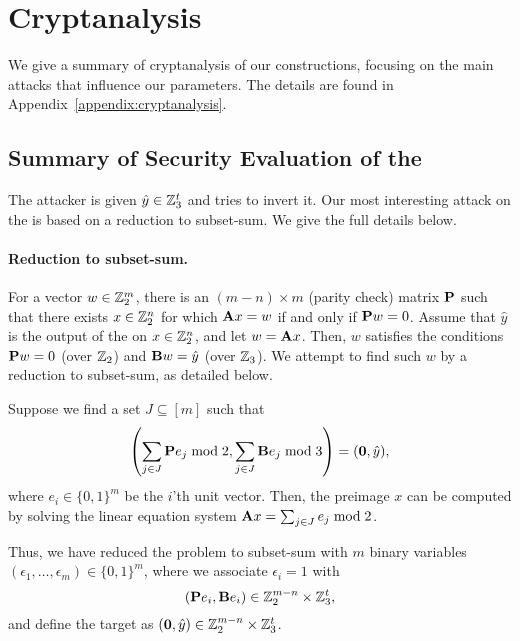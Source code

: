 \section{Cryptanalysis}
\label{sec:cryptanalysis}

We give a summary of cryptanalysis of our constructions,
focusing on the main attacks that influence our parameters.
The details are found in Appendix~\ref{appendix:cryptanalysis}.


\subsection{Summary of Security Evaluation of the \ttOWF}

The attacker is given $\hat{y} \in \mathbb{Z}_3^t$ and tries to invert it.
Our most interesting attack on the \ttOWF is based on a reduction to subset-sum.
We give the full details below.

\paragraph{Reduction to subset-sum.}
For a vector $w \in \mathbb{Z}_2^m$, there is an $(m -n) \times m$ (parity check) matrix $\mat{P}$ such that there exists $x \in \mathbb{Z}_2^n$ for which $\mat{A}x = w$ if and only if $\mat{P} w=0$.
Assume that $\hat{y}$ is the output of the \ttOWF on $x \in \mathbb{Z}_2^n$, and let $w = \mat{A}x$. Then,
$w$ satisfies the conditions $\mat{P} w = 0$ (over $\mathbb{Z}_2$) and $\mat{B}w = \hat{y}$ (over $\mathbb{Z}_3$).
We attempt to find such $w$ by a reduction to subset-sum, as detailed below.

Suppose we find a set $J \subseteq [m]$ such that
$$\left( \sum_{j \in J} \mat{P}e_j  \bmod 2, \sum_{j \in J} \mat{B}e_j  \bmod 3 \right) = (\vec{0},\hat{y}),$$
where $e_i \in \{0,1\}^m$ be the $i$'th unit vector.
Then, the preimage $x$ can be computed by solving the linear equation system
$\mat{A}x = \sum_{j \in J} e_j  \bmod 2$.

Thus, we have reduced the problem to subset-sum with $m$ binary variables
$(\epsilon_1, \ldots, \epsilon_m) \in \{0,1\}^m$, where we associate $\epsilon_i = 1$
with $$(\mat{P}e_i, \mat{B}e_i) \in \Z_2^{m-n} \times \Z_3^t,$$
and define the target
as $(\vec{0},\hat{y}) \in \Z_2^{m-n} \times \Z_3^t$.

